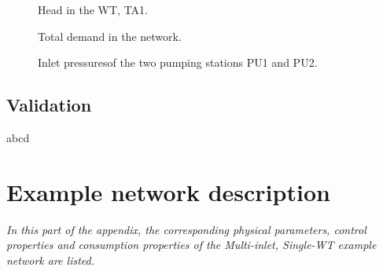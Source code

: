  

\vspace{-3mm}

 \begin{figure}[H]
 \centering
  
 \vspace{-1.5mm}
 \caption{Head in the WT, TA1.}
 \label{fig:WT_head_example}
 \end{figure}

 \vspace{-3mm}

 \begin{figure}[H]
 \centering
  
 \vspace{-1.5mm}
 \caption{Total demand in the network.}
 \label{fig:sigma_example}
 \end{figure}

 \begin{figure}[H]
 \centering
  
 \vspace{-1.5mm}
 \caption{Inlet pressuresof the two pumping stations PU1 and PU2.}
 \label{fig:sigma_example}
 \end{figure}

\section{Validation}
\label{validation_tests} 

abcd

\chapter{Example network description}
\label{physical_properties_example1}

\emph{In this part of the appendix, the corresponding physical parameters, control properties and consumption properties of the Multi-inlet, Single-WT example network are listed.}




